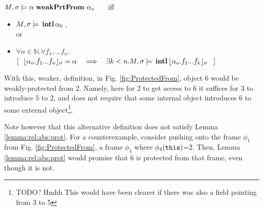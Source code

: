 $\satisfiesA{M}{\sigma}{ {\alpha\ }\textbf{weakPrtFrom}\ {\alpha_o} }$  \ \ \ iff \\
\begin{itemize}
\item $M , \sigma \models {\ensuremath{\, \mathbf{intl}}\, \alpha_0\, }$, \\ or
\item 
$\forall n\in\mathbb{N}. \forall f_1,...f_n.$\\
$
[\ \ \interpret{\sigma}{\alpha_{o}.f_1...f_n}=\alpha \ \ \  \Longrightarrow \ \ \ \exists k<n. \satisfiesA{M} {\sigma} {\internal{{\interpret{\sigma}{\alpha_{o}.f_1...f_{k}}}}}\ \ ]$
\end{itemize}


With this, weaker, definition, in Fig. \ref{fig:ProtectedFrom}, object $6$ would be weakly-protected from $2$. Namely,  here 
for $2$  to get access to $6$ it suffices for $3$ to introduce $5$ to $2$, and does not require that some internal object introduces $6$ to some external object\footnote{TODO? Hmhh This would have been clearer if there was also a field pointing from 3 to 5}.

Note however that this alternative definition does not satisfy Lemma \ref{lemma:rel:abs:prot}. For a counterexample,   consider pushing onto the frame $\phi_1$ from Fig. \ref{fig:ProtectedFrom}, a frame $\phi_4$ where $\phi_4({\texttt{this}})$=$2$. Then, Lemma
\ref{lemma:rel:abs:prot} would promise that $6$ is protected from that frame, even though it is not.




